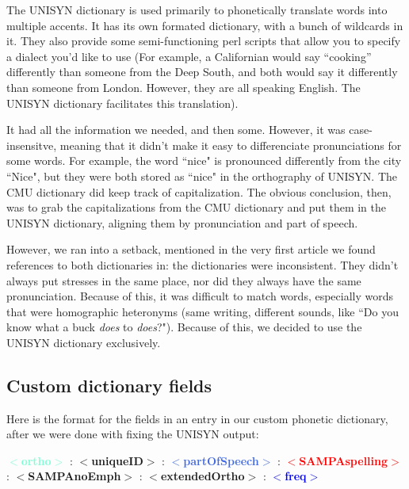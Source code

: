The UNISYN dictionary is used primarily to phonetically translate words into multiple accents.  It has its own formated dictionary, with a bunch of wildcards in it.  They also provide some semi-functioning perl scripts that allow you to specify a dialect you’d like to use (For example, a Californian would say “cooking” differently than someone from the Deep South, and both would say it differently than someone from London.  However, they are all speaking English.  The UNISYN dictionary facilitates this translation).  

It had all the information we needed, and then some.  However, it was case-insensitve, meaning that it didn't make it easy to differenciate pronunciations for some words. For example, the word ``nice" is pronounced differently from the city ``Nice", but they were both stored as ``nice" in the orthography of UNISYN.  The CMU dictionary did keep track of capitalization.  The obvious conclusion, then, was to grab the capitalizations from the CMU dictionary and put them in the UNISYN dictionary, aligning them by pronunciation and part of speech. 

However, we ran into a setback, mentioned in the very first article we found references to both dictionaries in:  the dictionaries were inconsistent\cite{polyakova_fusion_2007}.  They didn’t always put stresses in the same place, nor did they always have the same pronunciation.  Because of this, it was difficult to match words, especially words that were homographic heteronyms (same writing, different sounds, like ``Do you know what a buck \emph{does} to \emph{does}?").  Because of this, we decided to use the UNISYN dictionary exclusively.

\subsection{Custom dictionary fields}
\label{subsection:customDictionaryFields}

Here is the format for the fields in an entry in our custom phonetic dictionary, after we were done with fixing the UNISYN output:
\begin{center}
\textcolor{Aquamarine}{$<$\textbf{ortho}$>$} :
\textcolor{BurntOrange}{$<$\textbf{uniqueID}$>$} :
\textcolor{RoyalBlue}{$<$\textbf{partOfSpeech}$>$} :
\textcolor{Red}{$<$\textbf{SAMPAspelling}$>$} :
\textcolor{Rhodamine}{$<$\textbf{SAMPAnoEmph}$>$} :
\textcolor{Periwinkle}{$<$\textbf{extendedOrtho}$>$} :
\textcolor{Blue}{$<$\textbf{freq}$>$}
\end{center}


